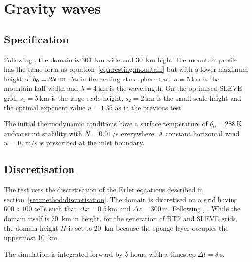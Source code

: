 \section{Gravity waves}
\label{sec:gw}


\subsection{Specification}
Following \textcite{melvin2010}, the domain is \SI{300}{\kilo\meter} wide and \SI{30}{\kilo\meter} high.  The mountain profile has the same form as equation~\ref{eqn:resting:mountain} but with a lower maximum height of $h_0 = \SI{250}{\meter}$.  As in the resting atmosphere test, $a = \SI{5}{\kilo\meter}$ is the mountain half-width and $\lambda = \SI{4}{\kilo\meter}$ is the wavelength.  On the optimised SLEVE grid, $s_1 = \SI{5}{\kilo\meter}$ is the large scale height, $s_2 = \SI{2}{\kilo\meter}$ is the small scale height and the optimal exponent value $n = 1.35$ as in the previous test.

The initial thermodynamic conditions have a surface temperature of $\theta_0 = \SI{288}{\kelvin}$ andconstant stability with $N = \SI{0.01}{\per\second}$ everywhere.  A constant horizontal wind $u = \SI{10}{\meter\per\second}$ is prescribed at the inlet boundary.


\subsection{Discretisation}
The test uses the discretisation of the Euler equations described in section~\ref{sec:method:discretisation}.  The domain is discretised on a grid having $600 \times 100$ cells such that $\Delta x = \SI{0.5}{\kilo\meter}$ and $\Delta z = \SI{300}{\meter}$.  Following \textcite{melvin2010}, .  While the domain itself is \SI{30}{\kilo\meter} in height, for the generation of BTF and SLEVE grids, the domain height $H$ is set to \SI{20}{\kilo\meter} because the sponge layer occupies the uppermost \SI{10}{\kilo\meter}.


The simulation is integrated forward by 5 hours with a timestep $\Delta t = \SI{8}{\second}$.

